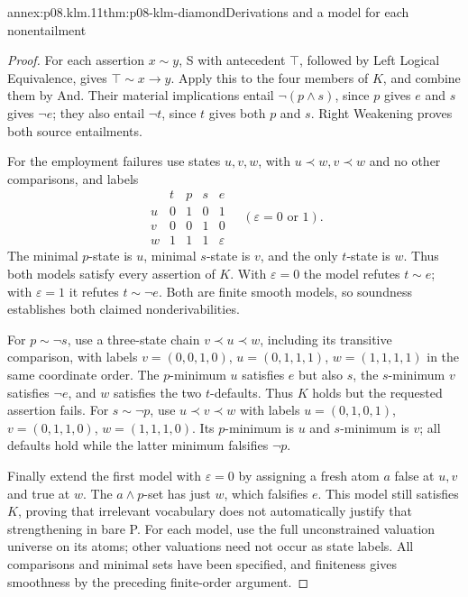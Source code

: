 \begin{annexitem}{annex:p08.klm.11}{thm:p08-klm-diamond}{Derivations and a model for each nonentailment}
\begin{proof}
For each assertion \(x\sim y\), S with antecedent \(\top\),
followed by Left Logical Equivalence, gives \(\top\sim x\to y\).
Apply this to the four members of \(K\), and combine them by And.
Their material implications entail \(\neg(p\wedge s)\), since
\(p\) gives \(e\) and \(s\) gives \(\neg e\); they also entail
\(\neg t\), since \(t\) gives both \(p\) and \(s\).
Right Weakening proves both source entailments.

For the employment failures use states \(u,v,w\), with
\(u\prec w,v\prec w\) and no other comparisons, and labels
\[
 \begin{array}{c|cccc}
 &t&p&s&e\\\hline
 u&0&1&0&1\\v&0&0&1&0\\w&1&1&1&\varepsilon
 \end{array}
 \quad(\varepsilon=0\text{ or }1).
\]
The minimal \(p\)-state is \(u\), minimal \(s\)-state is \(v\),
and the only \(t\)-state is \(w\). Thus both models satisfy every
assertion of \(K\). With \(\varepsilon=0\) the model refutes
\(t\sim e\); with \(\varepsilon=1\) it refutes
\(t\sim\neg e\). Both are finite smooth models, so soundness
establishes both claimed nonderivabilities.

For \(p\sim\neg s\), use a three-state chain \(v\prec u\prec w\),
including its transitive comparison, with labels
\(v=(0,0,1,0)\), \(u=(0,1,1,1)\), \(w=(1,1,1,1)\)
in the same coordinate order. The \(p\)-minimum \(u\) satisfies
\(e\) but also \(s\), the \(s\)-minimum \(v\) satisfies
\(\neg e\), and \(w\) satisfies the two \(t\)-defaults.
Thus \(K\) holds but the requested assertion fails.
For \(s\sim\neg p\), use \(u\prec v\prec w\) with labels
\(u=(0,1,0,1)\), \(v=(0,1,1,0)\), \(w=(1,1,1,0)\).
Its \(p\)-minimum is \(u\) and \(s\)-minimum is \(v\);
all defaults hold while the latter minimum falsifies \(\neg p\).

Finally extend the first model with \(\varepsilon=0\) by assigning
a fresh atom \(a\) false at \(u,v\) and true at \(w\).
The \(a\wedge p\)-set has just \(w\), which falsifies \(e\).
This model still satisfies \(K\), proving that irrelevant vocabulary
does not automatically justify that strengthening in bare P.
For each model, use the full unconstrained valuation universe on its
atoms; other valuations need not occur as state labels. All comparisons
and minimal sets have been specified, and finiteness gives smoothness
by the preceding finite-order argument.
\end{proof}
\end{annexitem}

